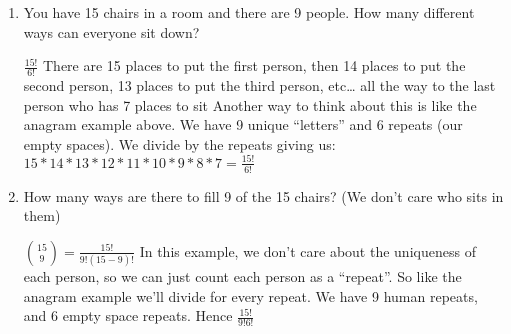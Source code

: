 \question 
\begin{enumerate}[label=(\alph*)]
\item
You have 15 chairs in a room and there are 9 people. How many different 
ways can everyone sit down?
\begin{solution}
$\frac{15!}{6!}$
There are 15 places to put the first person, then 14 places to put the 
second person, 13 places to put the third person, etc… all the way to 
the last person who has 7 places to sit
Another way to think about this is like the anagram example above. We 
have 9 unique “letters” and 6 repeats (our empty spaces). We divide by 
the repeats giving us:
$15*14*13*12*11*10*9*8*7 = \frac{15!}{6!}$
 \end{solution}
 
\item How many ways are there to fill 9 of the 15 chairs? (We don’t 
care who sits in them)

\begin{solution}
${15 \choose 9}  = \frac{15!}{9!(15-9)!}$
In this example, we don’t care about the uniqueness of each person, 
so we can just count each person as a “repeat”. So like the anagram 
example we’ll divide for every repeat. We have 9 human repeats, and 
6 empty space repeats. Hence $\frac{15!}{9!6!}$
\end{solution}

\end{enumerate}
